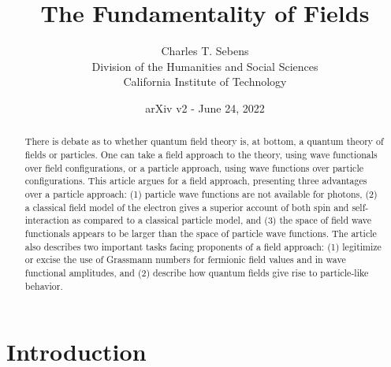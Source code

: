 \documentclass[onecolumn,secnumarabic,amsmath,amssymb,balancelastpage,nofootinbib]{article}
\begin{document}
\sloppy %




\title{\vspace*{-35 pt}\Huge{The Fundamentality of Fields}}
\author{Charles T. Sebens\\Division of the Humanities and Social Sciences\\ California Institute of Technology}
\date{arXiv v2 - June 24, 2022}


\maketitle
\vspace*{-20 pt}
\begin{abstract}
There is debate as to whether quantum field theory is, at bottom, a quantum theory of fields or particles.  One can take a field approach to the theory, using wave functionals over field configurations, or a particle approach, using wave functions over particle configurations.  This article argues for a field approach, presenting three advantages over a particle approach: (1) particle wave functions are not available for photons, (2) a classical field model of the electron gives a superior account of both spin and self-interaction as compared to a classical particle model, and (3) the space of field wave functionals appears to be larger than the space of particle wave functions.  The article also describes two important tasks facing proponents of a field approach: (1) legitimize or excise the use of Grassmann numbers for fermionic field values and in wave functional amplitudes, and (2) describe how quantum fields give rise to particle-like behavior.
\end{abstract}


\tableofcontents
\newpage


\section{Introduction}\label{introsec}
\end{document}
